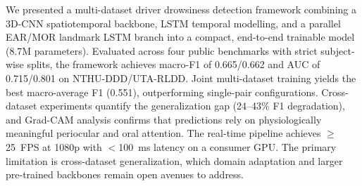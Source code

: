 \documentclass[journal]{IEEEtran}
\begin{document}
We presented a multi-dataset driver drowsiness detection framework combining a 3D-CNN spatiotemporal backbone, LSTM temporal modelling, and a parallel EAR/MOR landmark LSTM branch into a compact, end-to-end trainable model (8.7M parameters). Evaluated across four public benchmarks with strict subject-wise splits, the framework achieves macro-F1 of 0.665/0.662 and AUC of 0.715/0.801 on NTHU-DDD/UTA-RLDD. Joint multi-dataset training yields the best macro-average F1 (0.551), outperforming single-pair configurations. Cross-dataset experiments quantify the generalization gap (24--43\% F1 degradation), and Grad-CAM analysis confirms that predictions rely on physiologically meaningful periocular and oral attention. The real-time pipeline achieves $\geq$25~FPS at 1080p with $<$100~ms latency on a consumer GPU. The primary limitation is cross-dataset generalization, which domain adaptation and larger pre-trained backbones remain open avenues to address.



\end{document}
